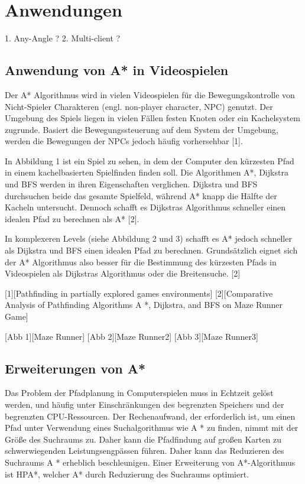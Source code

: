 \chapter{Anwendungen}

1. Any-Angle ?
2. Multi-client ?

\section{Anwendung von A* in Videospielen}

Der A* Algorithmus wird in vielen Videospielen für die Bewegungskontrolle von Nicht-Spieler Charakteren (engl. non-player character, NPC) genutzt. Der Umgebung des Spiels liegen in vielen Fällen festen Knoten oder ein Kachelsystem zugrunde. Basiert die Bewegungssteuerung auf dem System der Umgebung, werden die Bewegungen der NPCs jedoch häufig vorhersehbar [1].

In Abbildung 1 ist ein Spiel zu sehen, in dem der Computer den kürzesten Pfad in einem kachelbasierten Spielfinden finden soll. Die Algorithmen A*, Dijkstra und BFS werden in ihren Eigenschaften verglichen. Dijkstra und BFS durchsuchen beide das gesamte Spielfeld, während A* knapp die Hälfte der Kacheln untersucht. Dennoch schafft es Dijkstras Algorithmus schneller einen idealen Pfad zu berechnen als A* [2].

In komplexeren Levels (siehe Abbildung 2 und 3) schafft es A* jedoch schneller als Dijkstra und BFS einen idealen Pfad zu berechnen. Grundsätzlich eignet sich der A* Algorithmus also besser für die Bestimmung des kürzesten Pfads in Videospielen als Dijkstras Algorithmus oder die Breitensuche. [2]

[1][Pathfinding in partially explored games environments]
[2][Comparative Analysis of Pathfinding Algorithms A *, Dijkstra, and BFS on Maze Runner Game]

[Abb 1][Maze Runner]
[Abb 2][Maze Runner2]
[Abb 3][Maze Runner3]


\section{Erweiterungen von A*}
Das Problem der Pfadplanung in Computerspielen muss in Echtzeit gelöst werden, und  häufig unter Einschränkungen des begrenzten Speichers und der begrenzten CPU-Ressourcen. Der Rechenaufwand, der erforderlich ist, um einen Pfad unter Verwendung eines Suchalgorithmus wie A * zu finden, nimmt mit der Größe des Suchraums zu. Daher kann die Pfadfindung auf großen Karten zu schwerwiegenden Leistungsengpässen führen. Daher kann das Reduzieren des Suchraums A * erheblich beschleunigen. Einer Erweiterung von A*-Algorithmus ist HPA*, welcher A* durch Reduzierung des Suchraums optimiert\cite{hpa}. %

